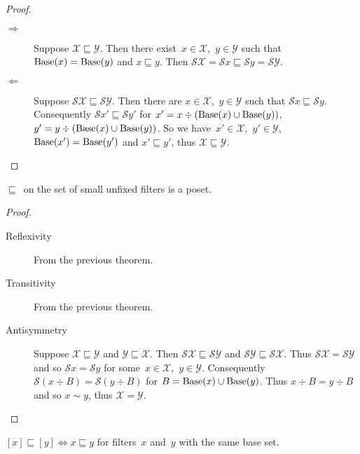\begin{proof}
~
\begin{description}
\item[$\Rightarrow$] Suppose
$\mathcal{X}\sqsubseteq\mathcal{Y}$. Then there
exist~$x\in\mathcal{X}$,~$y\in\mathcal{Y}$ such that
$\operatorname{Base}(x)=\operatorname{Base}(y)$ and $x\sqsubseteq y$. Then
$\mathscr{S}\mathcal{X} =
\mathscr{S}x \sqsubseteq \mathscr{S}y =
\mathscr{S}\mathcal{Y}$.

\item[$\Leftarrow$] Suppose
$\mathscr{S}\mathcal{X}\sqsubseteq\mathscr{S}\mathcal{Y}$.
Then there are $x\in\mathcal{X}$,~$y\in\mathcal{Y}$
such that $\mathscr{S}x\sqsubseteq\mathscr{S}y$.
Consequently
$\mathscr{S}x' \sqsubseteq\mathscr{S}y'$ for
$x'=x\div(\operatorname{Base}(x)\cup\operatorname{Base}(y))$,
$y'=y\div(\operatorname{Base}(x)\cup\operatorname{Base}(y))$.
So we have~$x'\in\mathcal{X}$,~$y'\in\mathcal{Y}$,
$\operatorname{Base}(x')=\operatorname{Base}(y')$ and $x'\sqsubseteq y'$,
thus $\mathcal{X}\sqsubseteq\mathcal{Y}$.
\end{description}
\end{proof}

\begin{thm}
$\sqsubseteq$~on the set of small unfixed filters is a poset.
\end{thm}

\begin{proof}
~
\begin{description}
\item[Reflexivity] From the previous theorem.

\item[Transitivity] From the previous theorem.

\item[Antisymmetry] Suppose
$\mathcal{X}\sqsubseteq\mathcal{Y}$ and
$\mathcal{Y}\sqsubseteq\mathcal{X}$. Then
$\mathscr{S}\mathcal{X}\sqsubseteq\mathscr{S}\mathcal{Y}$ and
$\mathscr{S}\mathcal{Y}\sqsubseteq\mathscr{S}\mathcal{X}$.
Thus $\mathscr{S}\mathcal{X}=\mathscr{S}\mathcal{Y}$ and
so $\mathscr{S}x=\mathscr{S}y$ for
some~$x\in\mathcal{X}$,~$y\in\mathcal{Y}$. Consequently
$\mathscr{S}(x\div B)=\mathscr{S}(y\div B)$ for
$B=\operatorname{Base}(x)\cup\operatorname{Base}(y)$. Thus $x\div B=y\div B$
and so $x\sim y$, thus $\mathcal{X}=\mathcal{Y}$.
\end{description}
\end{proof}

\begin{thm}
$[x]\sqsubseteq[y] \Leftrightarrow x\sqsubseteq y$ for
filters~$x$ and~$y$ with the same base set.
\end{thm}

